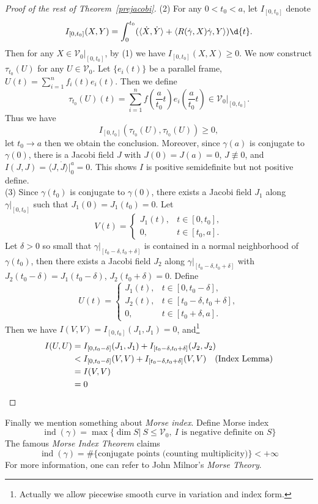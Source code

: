 \begin{proof}[Proof of the rest of Theorem~\ref{prejacobi}]
    (2) For any $0<t_0<a$, let $I_{[0,t_0]}$ denote
    \[I_{[0,t_0]}(X,Y)=\int_0^{t_0}(\langle\dot{X},\dot{Y}\rangle+\langle R(\dot{\gamma},X)\dot{\gamma},Y\rangle)\d{t}.\]
    Then for any $X\in\mathscr{V}_0|_{[0,t_0]}$, by (1) we have $I_{[0,t_0]}(X,X)\geq 0$.
    We now construct $\tau_{t_0}(U)$ for any $U\in\mathscr{V}_0$.
    Let $\{e_i(t)\}$ be a parallel frame, $U(t)=\sum_{i=1}^nf_i(t)e_i(t)$.
    Then we define
    \[\tau_{t_0}(U)(t)=\sum_{i=1}^nf\left(\frac{a}{t_0}t\right)e_i\left(\frac{a}{t_0}t\right)\in\mathscr{V}_0|_{[0,t_0]}.\]
    Thus we have
    \[I_{[0,t_0]}(\tau_{t_0}(U),\tau_{t_0}(U))\geq 0,\]
    let $t_0\to a$ then we obtain the conclusion.
    Moreover, since $\gamma(a)$ is conjugate to $\gamma(0)$, there is a Jacobi field $J$ with $J(0)=J(a)=0$, $J\not\equiv 0$, and $I(J,J)=\langle J,\dot{J}\rangle|^a_0=0$.
    This shows $I$ is positive semidefinite but not positive define.\\
    (3) Since $\gamma(t_0)$ is conjugate to $\gamma(0)$, there exists a Jacobi field $J_1$ along $\gamma|_{[0,t_0]}$ such that $J_1(0)=J_1(t_0)=0$.
    Let
    \[V(t)=\begin{cases}
        J_1(t), & t\in[0,t_0],\\
        0, & t\in[t_0,a].
    \end{cases}\]
    Let $\delta>0$ so small that $\gamma|_{[t_0-\delta,t_0+\delta]}$ is contained in a normal neighborhood of $\gamma(t_0)$, then there exists a Jacobi field $J_2$ along $\gamma|_{[t_0-\delta,t_0+\delta]}$ with $J_2(t_0-\delta)=J_1(t_0-\delta)$, $J_2(t_0+\delta)=0$.
    Define
    \[U(t)=\begin{cases}
        J_1(t), & t\in[0,t_0-\delta],\\
        J_2(t), & t\in[t_0-\delta,t_0+\delta],\\
        0, & t\in[t_0+\delta,a].
    \end{cases}\]
    Then we have $I(V,V)=I_{[0,t_0]}(J_1,J_1)=0$, and\footnote{Actually we allow piecewise smooth curve in variation and index form.}
    \begin{align*}
        I(U,U)&=I_{[0,t_0-\delta]}(J_1,J_1)+I_{[t_0-\delta,t_0+\delta]}(J_2,J_2)\\
        &<I_{[0,t_0-\delta]}(V,V)+I_{[t_0-\delta,t_0+\delta]}(V,V)\quad\text{(Index Lemma)}\\
        &=I(V,V)\\
        &=0\qedhere
    \end{align*}
\end{proof}

Finally we mention something about \emph{Morse index}.
Define Morse index
\[\operatorname{ind}(\gamma)=\max\{\dim S|\ S\leq\mathscr{V}_0,\ I\text{ is negative definite on }S\}\]
The famous \emph{Morse Index Theorem} claims
\[\operatorname{ind}(\gamma)=\#\{\text{conjugate points (counting multiplicity)}\}<+\infty\]
For more information, one can refer to John Milnor's \emph{Morse Theory}.